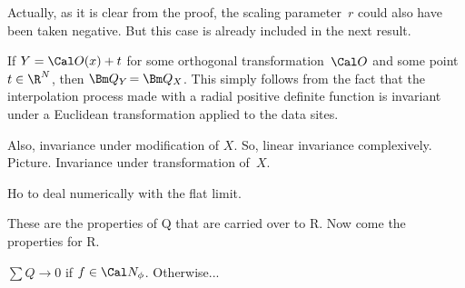 Actually, as it is clear from the proof, the scaling parameter~$r$ could also have been taken negative.  But this case is already included in the next result.

\preskip
\property If $Y=\Cal O(x) + t$ for some orthogonal transformation~$\Cal O$ and some point~$t\in\R^N$, then $\Bm Q_{Y\!} = \Bm Q_{X}$.
\proof
This simply follows from the fact that the interpolation process made with a radial positive definite function is invariant under a Euclidean transformation applied to the data sites.~\QED
\postskip



\Red
Also, invariance under modification of $X$.  So, linear invariance complexively. Picture.
\preskip
\property Invariance under transformation of~$X$.
\postskip

Ho to deal numerically with the flat limit.


These are the properties of Q that are carried over to R.  Now come the properties for R.


\preskip
\property
$\sum Q → 0$ if $f\in \Cal N_\phi$.  Otherwise...
\postskip

\Black

